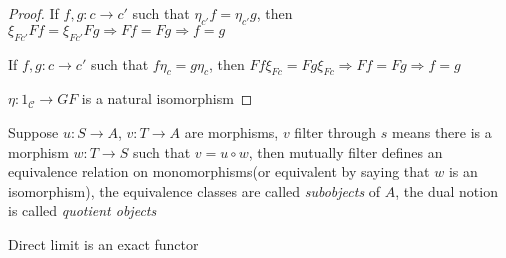 \documentclass[main]{subfiles}
\begin{document}
\begin{proof}
If $f,g:c\to c'$ such that $\eta_{c'}f=\eta_{c'}g$, then $\xi_{Fc'}Ff=\xi_{Fc'}Fg\Rightarrow Ff=Fg\Rightarrow f=g$ \par
If $f,g:c\to c'$ such that $f\eta_{c}=g\eta_{c}$, then $Ff\xi_{Fc}=Fg\xi_{Fc}\Rightarrow Ff=Fg\Rightarrow f=g$
\begin{center}
\end{center}
$\eta:1_{\mathscr C}\to GF$ is a natural isomorphism
\end{proof}

\begin{definition}
Suppose $u:S\to A$, $v:T\to A$ are morphisms, $v$ filter through $s$ means there is a morphism $w:T\to S$ such that $v=u\circ w$, then mutually filter defines an equivalence relation on monomorphisms(or equivalent by saying that $w$ is an isomorphism), the equivalence classes are called \textit{subobjects} of $A$, the dual notion is called \textit{quotient objects}
\end{definition}

\begin{proposition}
Direct limit is an exact functor
\end{proposition}
\end{document}
